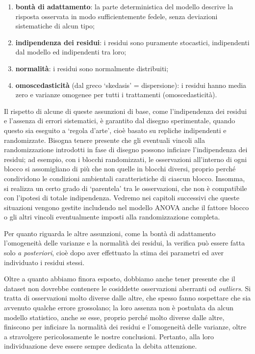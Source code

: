 \documentclass[a4paper,12pt,oneside]{book}
\providecommand{\tightlist}{%
  \setlength{\itemsep}{0pt}\setlength{\parskip}{0pt}}
\begin{document}
\begin{enumerate}
\def\labelenumi{\arabic{enumi}.}
\tightlist
\item
  \textbf{bontà di adattamento}: la parte deterministica del modello descrive la risposta osservata in modo sufficientemente fedele, senza deviazioni sistematiche di alcun tipo;
\item
  \textbf{indipendenza dei residui}: i residui sono puramente stocastici, indipendenti dal modello ed indipendenti tra loro;
\item
  \textbf{normalità}: i residui sono normalmente distribuiti;
\item
  \textbf{omoscedasticità} (dal greco `skedasis' = dispersione): i residui hanno media zero e varianze omogenee per tutti i trattamenti (omoscedasticità).
\end{enumerate}

Il rispetto di alcune di queste assunzioni di base, come l'indipendenza dei residui e l'assenza di errori sistematici, è garantito dal disegno sperimentale, quando questo sia eseguito a `regola d'arte', cioè basato su repliche indipendenti e randomizzate. Bisogna tenere presente che gli eventuali vincoli alla randomizzazione introdotti in fase di disegno possono inficiare l'indipendenza dei residui; ad esempio, con i blocchi randomizzati, le osservazioni all'interno di ogni blocco si assomigliano di più che non quelle in blocchi diversi, proprio perché condividono le condizioni ambientali caratteristiche di ciascun blocco. Insomma, si realizza un certo grado di `parentela' tra le osservazioni, che non è compatibile con l'ipotesi di totale indipendenza. Vedremo nei capitoli successivi che queste situazioni vengono gestite includendo nel modello ANOVA anche il fattore blocco o gli altri vincoli eventualmente imposti alla randomizzazione completa.

Per quanto riguarda le altre assunzioni, come la bontà di adattamento l'omogeneità delle varianze e la normalità dei residui, la verifica può essere fatta solo \emph{a posteriori}, cioè dopo aver effettuato la stima dei parametri ed aver individuato i residui stessi.

Oltre a quanto abbiamo finora esposto, dobbiamo anche tener presente che il dataset non dovrebbe contenere le cosiddette osservazioni aberranti od \emph{outliers}. Si tratta di osservazioni molto diverse dalle altre, che spesso fanno sospettare che sia avvenuto qualche errore grossolano; la loro assenza non è postulata da alcun modello statistico, anche se esse, proprio perché molto diverse dalle altre, finiscono per inficiare la normalità dei residui e l'omogeneità delle varianze, oltre a stravolgere pericolosamente le nostre conclusioni. Pertanto, alla loro individuazione deve essere sempre dedicata la debita attenzione.
\end{document}
